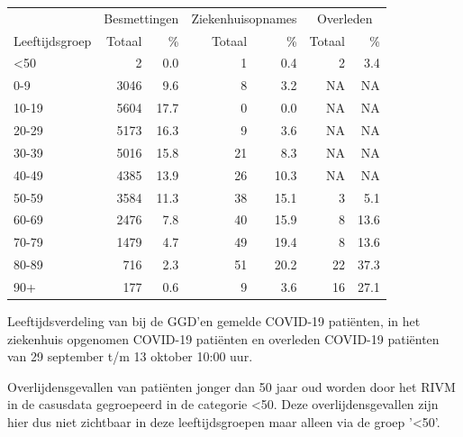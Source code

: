 \documentclass[
  english,
  man,floatsintext]{apa6}
\begin{document}
\begin{table}
\centering\begingroup\fontsize{11}{13}\selectfont

\begin{threeparttable}
\begin{tabular}{lrrrrrr}
\toprule
\multicolumn{1}{c}{ } & \multicolumn{2}{c}{Besmettingen} & \multicolumn{2}{c}{Ziekenhuisopnames} & \multicolumn{2}{c}{Overleden} \\
\cmidrule(l{3pt}r{3pt}){2-3} \cmidrule(l{3pt}r{3pt}){4-5} \cmidrule(l{3pt}r{3pt}){6-7}
Leeftijdsgroep & Totaal & \% & Totaal & \% & Totaal & \%\\
\midrule
<50 & 2 & 0.0 & 1 & 0.4 & 2 & 3.4\\
0-9 & 3046 & 9.6 & 8 & 3.2 & NA & NA\\
10-19 & 5604 & 17.7 & 0 & 0.0 & NA & NA\\
20-29 & 5173 & 16.3 & 9 & 3.6 & NA & NA\\
30-39 & 5016 & 15.8 & 21 & 8.3 & NA & NA\\
40-49 & 4385 & 13.9 & 26 & 10.3 & NA & NA\\
50-59 & 3584 & 11.3 & 38 & 15.1 & 3 & 5.1\\
60-69 & 2476 & 7.8 & 40 & 15.9 & 8 & 13.6\\
70-79 & 1479 & 4.7 & 49 & 19.4 & 8 & 13.6\\
80-89 & 716 & 2.3 & 51 & 20.2 & 22 & 37.3\\
90+ & 177 & 0.6 & 9 & 3.6 & 16 & 27.1\\
\bottomrule
\end{tabular}
\begin{tablenotes}
\item[1] Leeftijdsverdeling van bij de GGD’en gemelde COVID-19 patiënten, in het ziekenhuis opgenomen COVID-19 patiënten en overleden COVID-19 patiënten van 29 september t/m 13 oktober 10:00 uur.
\item[2] Overlijdensgevallen van patiënten jonger dan 50 jaar oud worden door het RIVM in de casusdata gegroepeerd in de categorie <50. Deze overlijdensgevallen zijn hier dus niet zichtbaar in deze leeftijdsgroepen maar alleen via de groep '<50'.
\end{tablenotes}
\end{threeparttable}
\endgroup{}
\end{table}

\newpage
\end{document}
